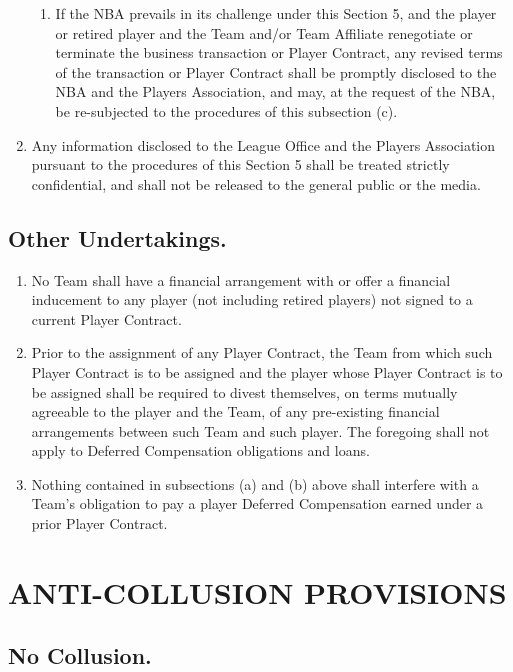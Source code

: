 \documentclass[
]{book}
\providecommand{\tightlist}{%
  \setlength{\itemsep}{0pt}\setlength{\parskip}{0pt}}
\begin{document}
\begin{enumerate}
\begin{enumerate}
  \item
    If the NBA prevails in its challenge under this Section 5, and the player or retired player and the Team and/or Team Affiliate renegotiate or terminate the business transaction or Player Contract, any revised terms of the transaction or Player Contract shall be promptly disclosed to the NBA and the Players Association, and may, at the request of the NBA, be re-subjected to the procedures of this subsection (c).
  \end{enumerate}
\item
  Any information disclosed to the League Office and the Players Association pursuant to the procedures of this Section 5 shall be treated strictly confidential, and shall not be released to the general public or the media.
\end{enumerate}

\hypertarget{other-undertakings.}{%
\section{Other Undertakings.}\label{other-undertakings.}}

\begin{enumerate}
\def\labelenumi{(\alph{enumi})}
\tightlist
\item
  No Team shall have a financial arrangement with or offer a financial inducement to any player (not including retired players) not signed to a current Player Contract.
\item
  Prior to the assignment of any Player Contract, the Team from which such Player Contract is to be assigned and the player whose Player Contract is to be assigned shall be required to divest themselves, on terms mutually agreeable to the player and the Team, of any pre-existing financial arrangements between such Team and such player. The foregoing shall not apply to Deferred Compensation obligations and loans.
\item
  Nothing contained in subsections (a) and (b) above shall interfere with a Team's obligation to pay a player Deferred Compensation earned under a prior Player Contract.
\end{enumerate}

\hypertarget{anti-collusion-provisions}{%
\chapter{ANTI-COLLUSION PROVISIONS}\label{anti-collusion-provisions}}

\hypertarget{no-collusion.}{%
\section{No Collusion.}\label{no-collusion.}}
\end{document}
